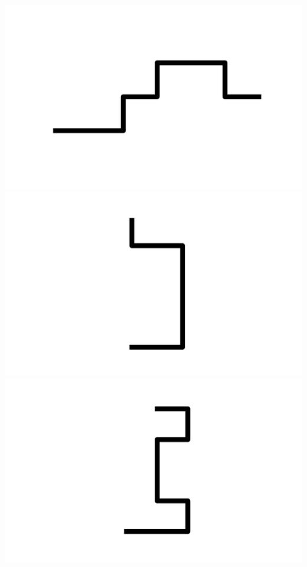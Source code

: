 \documentclass[]{report}
\begin{document}
\includegraphics[scale=.1]{pictures/21/state_cluster_shapes_184.pdf} 
\includegraphics[scale=.1]{pictures/21/state_cluster_shapes_185.pdf} 
\includegraphics[scale=.1]{pictures/21/state_cluster_shapes_186.pdf} 
\end{document}
